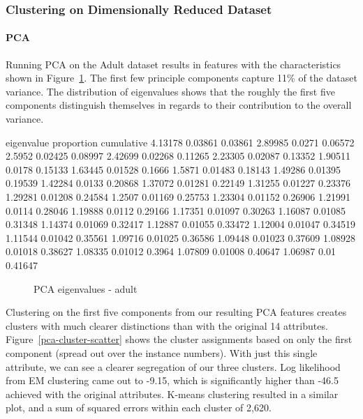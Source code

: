 \documentclass{sig-alternate}
\begin{document}
\subsubsection{Clustering on Dimensionally Reduced Dataset}


\paragraph{PCA}
Running PCA on the Adult dataset results in features with the characteristics shown in Figure~\ref{pca-adult}. The first few principle components capture 11\% of the dataset variance. The distribution of eigenvalues shows that the roughly the first five components distinguish themselves in regards to their contribution to the overall variance.


\begin{verbbox}
eigenvalue  proportion  cumulative
4.13178     0.03861     0.03861
2.89985     0.0271      0.06572
2.5952      0.02425     0.08997
2.42699     0.02268     0.11265
2.23305     0.02087     0.13352
1.90511     0.0178      0.15133
1.63445     0.01528     0.1666 
1.5871      0.01483     0.18143
1.49286     0.01395     0.19539
1.42284     0.0133      0.20868
1.37072     0.01281     0.22149
1.31255     0.01227     0.23376
1.29281     0.01208     0.24584
1.2507      0.01169     0.25753
1.23304     0.01152     0.26906
1.21991     0.0114      0.28046
1.19888     0.0112      0.29166
1.17351     0.01097     0.30263
1.16087     0.01085     0.31348
1.14374     0.01069     0.32417
1.12887     0.01055     0.33472
1.12004     0.01047     0.34519
1.11544     0.01042     0.35561
1.09716     0.01025     0.36586
1.09448     0.01023     0.37609
1.08928     0.01018     0.38627
1.08335     0.01012     0.3964 
1.07809     0.01008     0.40647
1.06987     0.01        0.41647
\end{verbbox}

\begin{figure}[!htbp]
    \centering
    \theverbbox
    \caption{PCA eigenvalues - adult\label{pca-adult}}
\end{figure}

Clustering on the first five components from our resulting PCA features creates clusters with much clearer distinctions than with the original 14 attributes. Figure~\ref{pca-cluster-scatter} shows the cluster assignments based on only the first component (spread out over the instance numbers). With just this single attribute, we can see a clearer segregation of our three clusters. Log likelihood from EM clustering came out to -9.15, which is significantly higher than -46.5 achieved with the original attributes. K-means clustering resulted in a similar plot, and a sum of squared errors within each cluster of 2,620.
\end{document}
